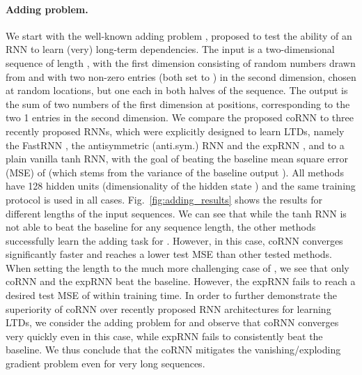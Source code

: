 \documentclass{article} \usepackage{iclr2021_conference,times}
\newcommand{\fref}[1] {Fig.~\ref{#1}}
\begin{document}
\paragraph{Adding problem.} We start with the well-known adding problem \citep{lstm}, proposed to test the ability of an RNN to learn (very) long-term dependencies. The input is a two-dimensional sequence of length , with the first dimension consisting of random numbers drawn from  and with two non-zero entries (both set to ) in the second dimension, chosen at random locations, but one each in both halves of the sequence. The output is the sum of two numbers of the first dimension at positions, corresponding to the two 1 entries in the second dimension. We compare the proposed coRNN to three recently proposed RNNs, which were explicitly designed to learn LTDs, namely the FastRNN \citep{fastrnn}, the antisymmetric (anti.sym.) RNN \citep{anti} and the expRNN \citep{expRNN}, and to a plain vanilla tanh RNN, with the goal of beating the baseline mean square error (MSE) of  (which stems from the variance of the baseline output ). All methods have 128 hidden units (dimensionality of the hidden state ) and the same training protocol is used in all cases. \fref{fig:adding_results} shows the results for different lengths  of the input sequences. We can see that while the tanh RNN is not able to beat the baseline for any sequence length, the other methods successfully learn the adding task for . However, in this case, coRNN converges significantly faster and reaches a lower test MSE than other tested methods. When setting the length to the much more challenging case of , we see that only coRNN and the expRNN beat the baseline. However, the expRNN fails to reach a desired test MSE of  within training time. In order to further demonstrate the superiority of coRNN over recently proposed RNN architectures for learning LTDs, we consider the adding problem for  and observe that coRNN converges very quickly even in this case, while expRNN fails to consistently beat the baseline. We thus conclude that the coRNN mitigates the vanishing/exploding gradient problem even for very long sequences.
\end{document}
